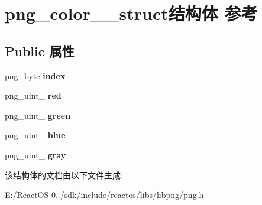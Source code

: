 \hypertarget{structpng__color__16__struct}{}\section{png\+\_\+color\+\_\+\_\+struct结构体 参考}
\label{structpng__color__16__struct}
\subsection*{Public 属性}
\begin{DoxyCompactItemize}
\item 
\mbox{\label{structpng__color__16__struct_a44a918da0d9a50cf94fcad5a3c741ee0}} 
png\+\_\+byte {\bfseries index}
\item 
\mbox{\label{structpng__color__16__struct_a069bad345aefbe4eab29fcc1d8af91e6}} 
png\+\_\+uint\+\_ {\bfseries red}
\item 
\mbox{\label{structpng__color__16__struct_af01259ffd46c78eff9b1ad584a295126}} 
png\+\_\+uint\+\_ {\bfseries green}
\item 
\mbox{\label{structpng__color__16__struct_afd68833319d436582aa5911de7cdd46b}} 
png\+\_\+uint\+\_ {\bfseries blue}
\item 
\mbox{\label{structpng__color__16__struct_a660a572a0a2f4094408f2fecb61571ac}} 
png\+\_\+uint\+\_ {\bfseries gray}
\end{DoxyCompactItemize}


该结构体的文档由以下文件生成\+:\begin{DoxyCompactItemize}
\item 
E\+:/\+React\+O\+S-\/0../sdk/include/reactos/libs/libpng/png.\+h\end{DoxyCompactItemize}
